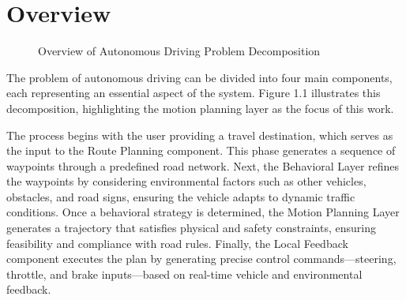 \section{Overview} \label{sec:overview}

\begin{figure}[h!]
	\centering
	\caption{Overview of Autonomous Driving Problem Decomposition}
	\label{fig:autonomous_driving_overview}
\end{figure}

The problem of autonomous driving can be divided into four main components, each representing an essential aspect of the system.
Figure 1.1 illustrates this decomposition, highlighting the motion planning layer as the focus of this work.

The process begins with the user providing a travel destination, which serves as the input to the Route Planning component.
This phase generates a sequence of waypoints through a predefined road network.
Next, the Behavioral Layer refines the waypoints by considering environmental factors such as other vehicles, obstacles, and road signs, ensuring the
vehicle adapts to dynamic traffic conditions.
Once a behavioral strategy is determined, the Motion Planning Layer generates a trajectory that satisfies physical and safety constraints, ensuring
feasibility and compliance with road rules.
Finally, the Local Feedback component executes the plan by generating precise control commands—steering, throttle, and brake inputs—based on
real-time vehicle and environmental feedback.

